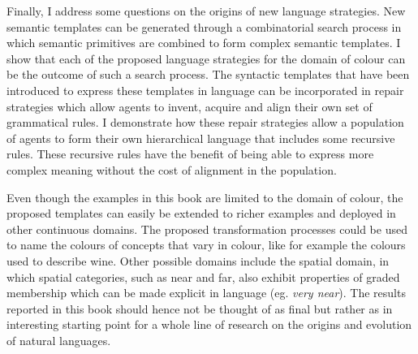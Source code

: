 Finally, I address some questions on the origins of new language
strategies. New semantic templates can be generated through a
combinatorial search process in which semantic primitives are combined
to form complex semantic templates. I show that each of the proposed
language strategies for the domain of colour can be the outcome of
such a search process. The syntactic templates that have been
introduced to express these templates in language can be incorporated
in repair strategies which allow agents to invent, acquire and align
their own set of grammatical rules. I demonstrate how these repair
strategies allow a population of agents to form their own hierarchical
language that includes some recursive rules. These recursive rules
have the benefit of being able to express more complex meaning without
the cost of alignment in the population.

Even though the examples in this book are limited to the domain of
colour, the proposed templates can easily be extended to richer
examples and deployed in other continuous domains. The proposed
transformation processes could be used to name the colours of concepts
that vary in colour, like for example the colours used to describe
wine. Other possible domains include the spatial domain, in which
spatial categories, such as near and far, also exhibit properties of
graded membership which can be made explicit in language (eg. \textit{very
near}).  The results reported in this book should hence not be
thought of as final but rather as in interesting starting
point for a whole line of research on the origins and evolution of
natural languages.